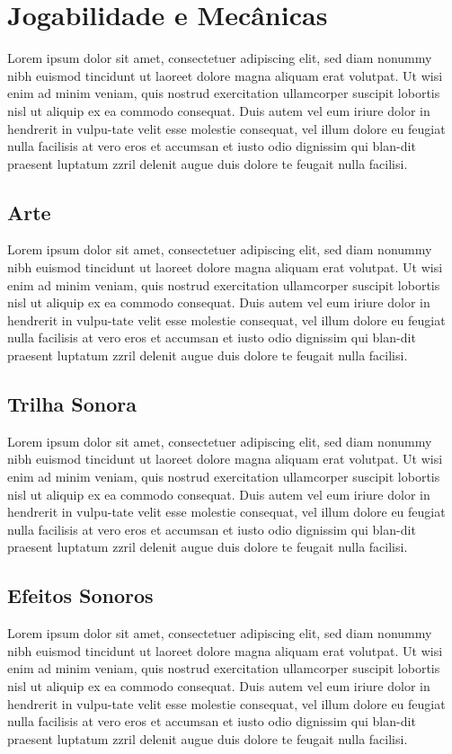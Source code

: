\section{Jogabilidade e Mecânicas}
\label{secao:jogabilidade_mecanicas}
Lorem ipsum dolor sit amet, consectetuer adipiscing elit, sed diam nonummy nibh euismod tincidunt ut laoreet dolore magna aliquam erat volutpat. Ut wisi enim ad minim veniam, quis nostrud exercitation ullamcorper suscipit lobortis nisl ut aliquip ex ea commodo consequat. Duis autem vel eum iriure dolor in hendrerit in vulpu-tate velit esse molestie consequat, vel illum dolore eu feugiat nulla facilisis at vero eros et accumsan et iusto odio dignissim qui blan-dit praesent luptatum zzril delenit augue duis dolore te feugait nulla facilisi.

\subsection{Arte}
\label{secao:arte}
Lorem ipsum dolor sit amet, consectetuer adipiscing elit, sed diam nonummy nibh euismod tincidunt ut laoreet dolore magna aliquam erat volutpat. Ut wisi enim ad minim veniam, quis nostrud exercitation ullamcorper suscipit lobortis nisl ut aliquip ex ea commodo consequat. Duis autem vel eum iriure dolor in hendrerit in vulpu-tate velit esse molestie consequat, vel illum dolore eu feugiat nulla facilisis at vero eros et accumsan et iusto odio dignissim qui blan-dit praesent luptatum zzril delenit augue duis dolore te feugait nulla facilisi.

\subsection{Trilha Sonora}
\label{secao:trilha_sonora}
Lorem ipsum dolor sit amet, consectetuer adipiscing elit, sed diam nonummy nibh euismod tincidunt ut laoreet dolore magna aliquam erat volutpat. Ut wisi enim ad minim veniam, quis nostrud exercitation ullamcorper suscipit lobortis nisl ut aliquip ex ea commodo consequat. Duis autem vel eum iriure dolor in hendrerit in vulpu-tate velit esse molestie consequat, vel illum dolore eu feugiat nulla facilisis at vero eros et accumsan et iusto odio dignissim qui blan-dit praesent luptatum zzril delenit augue duis dolore te feugait nulla facilisi.

\subsection{Efeitos Sonoros}
\label{secao:efeitos_sonoros}
Lorem ipsum dolor sit amet, consectetuer adipiscing elit, sed diam nonummy nibh euismod tincidunt ut laoreet dolore magna aliquam erat volutpat. Ut wisi enim ad minim veniam, quis nostrud exercitation ullamcorper suscipit lobortis nisl ut aliquip ex ea commodo consequat. Duis autem vel eum iriure dolor in hendrerit in vulpu-tate velit esse molestie consequat, vel illum dolore eu feugiat nulla facilisis at vero eros et accumsan et iusto odio dignissim qui blan-dit praesent luptatum zzril delenit augue duis dolore te feugait nulla facilisi.

